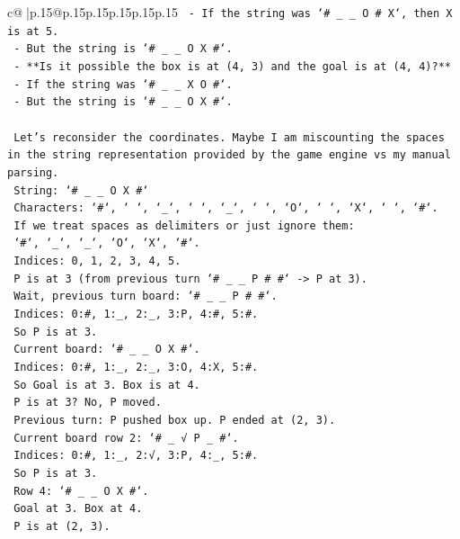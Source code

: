 \documentclass{article}
\begin{document}
{\begin{supertabular}{c@{$\;$}|p{.15\linewidth}@{}p{.15\linewidth}p{.15\linewidth}p{.15\linewidth}p{.15\linewidth}p{.15\linewidth}}
{{{\texttt{        {-}   If the string was `\# \_ \_ O \# X`, then X is at 5.} \\
\texttt{        {-}   But the string is `\# \_ \_ O X \#`.} \\
\texttt{    {-}   **Is it possible the box is at (4, 3) and the goal is at (4, 4)?**} \\
\texttt{        {-}   If the string was `\# \_ \_ X O \#`.} \\
\texttt{        {-}   But the string is `\# \_ \_ O X \#`.} \\
\\ 
\texttt{    Let's reconsider the coordinates. Maybe I am miscounting the spaces in the string representation provided by the game engine vs my manual parsing.} \\
\texttt{    String: `\# \_ \_ O X \#`} \\
\texttt{    Characters: `\#`, ` `, `\_`, ` `, `\_`, ` `, `O`, ` `, `X`, ` `, `\#`.} \\
\texttt{    If we treat spaces as delimiters or just ignore them:} \\
\texttt{    `\#`, `\_`, `\_`, `O`, `X`, `\#`.} \\
\texttt{    Indices: 0, 1, 2, 3, 4, 5.} \\
\texttt{    P is at 3 (from previous turn `\# \_ \_ P \# \#` {-}> P at 3).} \\
\texttt{    Wait, previous turn board: `\# \_ \_ P \# \#`.} \\
\texttt{    Indices: 0:\#, 1:\_, 2:\_, 3:P, 4:\#, 5:\#.} \\
\texttt{    So P is at 3.} \\
\texttt{    Current board: `\# \_ \_ O X \#`.} \\
\texttt{    Indices: 0:\#, 1:\_, 2:\_, 3:O, 4:X, 5:\#.} \\
\texttt{    So Goal is at 3. Box is at 4.} \\
\texttt{    P is at 3? No, P moved.} \\
\texttt{    Previous turn: P pushed box up. P ended at (2, 3).} \\
\texttt{    Current board row 2: `\# \_ √ P \_ \#`.} \\
\texttt{    Indices: 0:\#, 1:\_, 2:√, 3:P, 4:\_, 5:\#.} \\
\texttt{    So P is at 3.} \\
\texttt{    Row 4: `\# \_ \_ O X \#`.} \\
\texttt{    Goal at 3. Box at 4.} \\
\texttt{    P is at (2, 3).} \\
}}}
\end{supertabular}}
\end{document}
